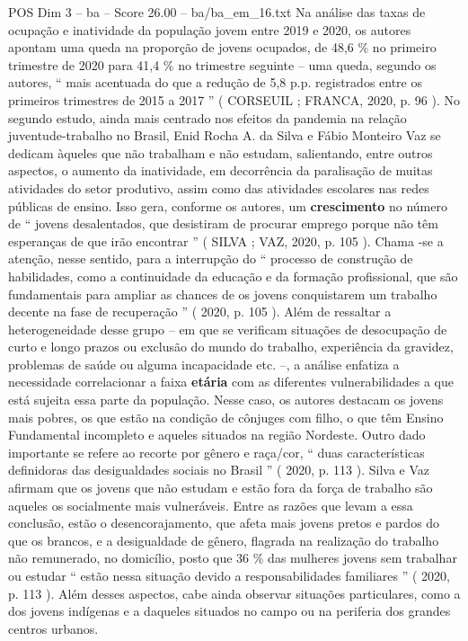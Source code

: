 \begin{textsample}{POS Dim 3 – ba – Score 26.00 – ba/ba\_em\_16.txt}
Na análise das taxas de ocupação e inatividade da população jovem entre 2019 e 2020, os autores apontam uma queda na proporção de jovens ocupados, de 48,6 \% no primeiro trimestre de 2020 para 41,4 \% no trimestre seguinte – uma queda, segundo os autores, “ mais acentuada do que a redução de 5,8 p.p. registrados entre os primeiros trimestres de 2015 a 2017 ” ( CORSEUIL ; FRANCA, 2020, p. 96 ).
No segundo estudo, ainda mais centrado nos efeitos da pandemia na relação juventude-trabalho no Brasil, Enid Rocha A. da Silva e Fábio Monteiro Vaz se dedicam àqueles que não trabalham e não estudam, salientando, entre outros aspectos, o aumento da inatividade, em decorrência da paralisação de muitas atividades do setor produtivo, assim como das atividades escolares nas redes públicas de ensino.
Isso gera, conforme os autores, um \textbf{crescimento} no número de “ jovens desalentados, que desistiram de procurar emprego porque não têm esperanças de que irão encontrar ” ( SILVA ; VAZ, 2020, p. 105 ).
Chama -se a atenção, nesse sentido, para a interrupção do “ processo de construção de habilidades, como a continuidade da educação e da formação profissional, que são fundamentais para ampliar as chances de os jovens conquistarem um trabalho decente na fase de recuperação ” ( 2020, p. 105 ).
Além de ressaltar a heterogeneidade desse grupo – em que se verificam situações de desocupação de curto e longo prazos ou exclusão do mundo do trabalho, experiência da gravidez, problemas de saúde ou alguma incapacidade etc. –, a análise enfatiza a necessidade correlacionar a faixa \textbf{etária} com as diferentes vulnerabilidades a que está sujeita essa parte da população.
Nesse caso, os autores destacam os jovens mais pobres, os que estão na condição de cônjuges com filho, o que têm Ensino Fundamental incompleto e aqueles situados na região Nordeste.
Outro dado importante se refere ao recorte por gênero e raça/cor, “ duas características definidoras das desigualdades sociais no Brasil ” ( 2020, p. 113 ).
Silva e Vaz afirmam que os jovens que não estudam e estão fora da força de trabalho são aqueles os socialmente mais vulneráveis.
Entre as razões que levam a essa conclusão, estão o desencorajamento, que afeta mais jovens pretos e pardos do que os brancos, e a desigualdade de gênero, flagrada na realização do trabalho não remunerado, no domicílio, posto que 36 \% das mulheres jovens sem trabalhar ou estudar “ estão nessa situação devido a responsabilidades familiares ” ( 2020, p. 113 ).
Além desses aspectos, cabe ainda observar situações particulares, como a dos jovens indígenas e a daqueles situados no campo ou na periferia dos grandes centros urbanos.

\end{textsample}
